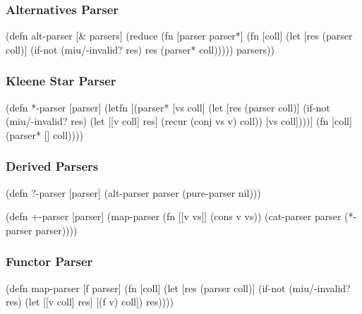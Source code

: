 \documentclass{beamer}
\begin{document}

\begin{frame}[fragile]
\frametitle{Alternatives Parser}

\begin{semiverbatim}
(defn alt-parser [& parsers]
  (reduce (fn [parser parser*]
            (fn [coll]
              (let [res (parser coll)]
                (if-not (miu/-invalid? res)
                  res
                  (parser* coll)))))
          parsers))
\end{semiverbatim}

\end{frame}


\begin{frame}[fragile]
\frametitle{Kleene Star Parser}

\begin{semiverbatim}
(defn *-parser [parser]
  (letfn [(parser* [vs coll]
            (let [res (parser coll)]
              (if-not (miu/-invalid? res)
                (let [[v coll] res]
                  (recur (conj vs v) coll))
                [vs coll])))]
    (fn [coll] (parser* [] coll))))
\end{semiverbatim}

\end{frame}


\begin{frame}[fragile]
\frametitle{Derived Parsers}

\begin{semiverbatim}
(defn ?-parser [parser]
  (alt-parser parser (pure-parser nil)))
\end{semiverbatim}

\begin{semiverbatim}
(defn +-parser [parser]
  (map-parser (fn [[v vs]] (cons v vs))
              (cat-parser parser (*-parser parser))))
\end{semiverbatim}

\end{frame}


\begin{frame}[fragile]
\frametitle{Functor Parser}

\begin{semiverbatim}
(defn map-parser [f parser]
  (fn [coll]
    (let [res (parser coll)]
      (if-not (miu/-invalid? res)
        (let [[v coll] res]
          [(f v) coll])
        res))))
\end{semiverbatim}

\end{frame}
\end{document}
